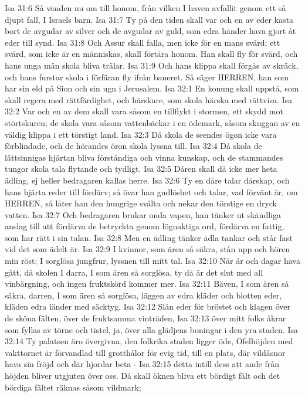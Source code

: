 Isa 31:6  Så vänden nu om till honom, från vilken I haven avfallit genom ett så djupt fall, I Israels barn.
Isa 31:7  Ty på den tiden skall var och en av eder kasta bort de avgudar av silver och de avgudar av guld, som edra händer hava gjort åt eder till synd.
Isa 31:8  Och Assur skall falla, men icke för en mans svärd; ett svärd, som icke är en människas, skall förtära honom. Han skall fly för svärd, och hans unga män skola bliva trälar.
Isa 31:9  Och hans klippa skall förgås av skräck, och hans furstar skola i förfäran fly ifrån baneret. Så säger HERREN, han som har sin eld på Sion och sin ugn i Jerusalem.
Isa 32:1  En konung skall uppstå, som skall regera med rättfärdighet, och härskare, som skola härska med rättvisa.
Isa 32:2  Var och en av dem skall vara såsom en tillflykt i stormen, ett skydd mot störtskuren; de skola vara såsom vattenbäckar i en ödemark, såsom skuggan av en väldig klippa i ett törstigt land.
Isa 32:3  Då skola de seendes ögon icke vara förblindade, och de hörandes öron skola lyssna till.
Isa 32:4  Då skola de lättsinnigas hjärtan bliva förståndiga och vinna kunskap, och de stammandes tungor skola tala flytande och tydligt.
Isa 32:5  Dåren skall då icke mer heta ädling, ej heller bedragaren kallas herre.
Isa 32:6  Ty en dåre talar dårskap, och hans hjärta reder till fördärv; så övar han gudlöshet och talar, vad förvänt är, om HERREN, så låter han den hungrige svälta och nekar den törstige en dryck vatten.
Isa 32:7  Och bedragaren brukar onda vapen, han tänker ut skändliga anslag till att fördärva de betryckta genom lögnaktiga ord, fördärva en fattig, som har rätt i sin talan.
Isa 32:8  Men en ädling tänker ädla tankar och står fast vid det som ädelt är.
Isa 32:9  I kvinnor, som ären så säkra, stån upp och hören min röst; I sorglösa jungfrur, lyssnen till mitt tal.
Isa 32:10  När år och dagar hava gått, då skolen I darra, I som ären så sorglösa, ty då är det slut med all vinbärgning, och ingen fruktskörd kommer mer.
Isa 32:11  Bäven, I som ären så säkra, darren, I som ären så sorglösa, läggen av edra kläder och blotten eder, kläden edra länder med säcktyg.
Isa 32:12  Slån eder för bröstet och klagen över de sköna fälten, över de fruktsamma vinträden,
Isa 32:13  över mitt folks åkrar som fyllas av törne och tistel, ja, över alla glädjens boningar i den yra staden.
Isa 32:14  Ty palatsen äro övergivna, den folkrika staden ligger öde, Ofelhöjden med vakttornet är förvandlad till grotthålor för evig tid, till en plats, där vildåsnor hava sin fröjd och där hjordar beta -
Isa 32:15  detta intill dess att ande från höjden bliver utgjuten över oss. Då skall öknen bliva ett bördigt fält och det bördiga fältet räknas såsom vildmark;
